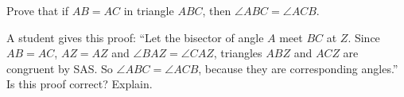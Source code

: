 Prove that if $AB=AC$ in triangle $ABC$, then $\angle ABC=\angle ACB$.

A student gives this proof: ``Let the bisector of angle $A$ meet $BC$ at $Z$. Since $AB=AC$, $AZ=AZ$ and $\angle BAZ=\angle CAZ$, triangles $ABZ$ and $ACZ$ are congruent by SAS. So $\angle ABC=\angle ACB$, because they are corresponding angles.'' Is this proof correct? Explain.
